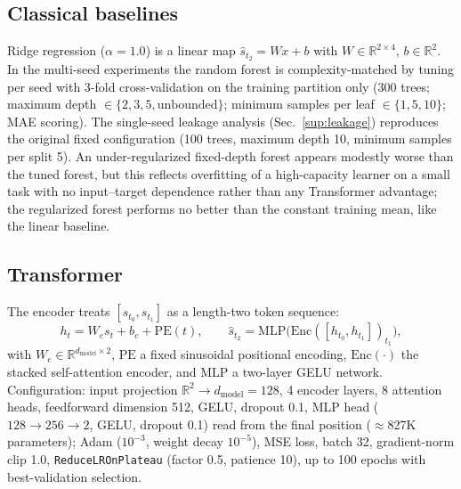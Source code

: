 \documentclass[10pt,journal,compsoc]{IEEEtran}
\begin{document}
\subsection{Classical baselines}
Ridge regression ($\alpha=1.0$) is a linear map $\hat{s}_{t_2}=Wx+b$ with $W\in\mathbb{R}^{2\times4}$, $b\in\mathbb{R}^2$. In the multi-seed experiments the random forest is complexity-matched by tuning per seed with 3-fold cross-validation on the training partition only (300 trees; maximum depth $\in\{2,3,5,\text{unbounded}\}$; minimum samples per leaf $\in\{1,5,10\}$; MAE scoring). The single-seed leakage analysis (Sec.~\ref{sup:leakage}) reproduces the original fixed configuration (100 trees, maximum depth 10, minimum samples per split 5). An under-regularized fixed-depth forest appears modestly worse than the tuned forest, but this reflects overfitting of a high-capacity learner on a small task with no input--target dependence rather than any Transformer advantage; the regularized forest performs no better than the constant training mean, like the linear baseline.

\subsection{Transformer}
The encoder treats $[s_{t_0},s_{t_1}]$ as a length-two token sequence:
\begin{equation}
h_t = W_e s_t + b_e + \mathrm{PE}(t),\qquad
\hat{s}_{t_2} = \mathrm{MLP}\big(\mathrm{Enc}([h_{t_0},h_{t_1}])_{t_1}\big),
\end{equation}
with $W_e\in\mathbb{R}^{d_{\mathrm{model}}\times 2}$, $\mathrm{PE}$ a fixed sinusoidal positional encoding, $\mathrm{Enc}(\cdot)$ the stacked self-attention encoder, and $\mathrm{MLP}$ a two-layer GELU network. Configuration: input projection $\mathbb{R}^2\!\rightarrow\!d_{\mathrm{model}}{=}128$, 4 encoder layers, 8 attention heads, feedforward dimension 512, GELU, dropout 0.1, MLP head ($128\!\rightarrow\!256\!\rightarrow\!2$, GELU, dropout 0.1) read from the final position ($\approx$827K parameters); Adam ($10^{-3}$, weight decay $10^{-5}$), MSE loss, batch 32, gradient-norm clip 1.0, \texttt{ReduceLROnPlateau} (factor 0.5, patience 10), up to 100 epochs with best-validation selection.
\end{document}

